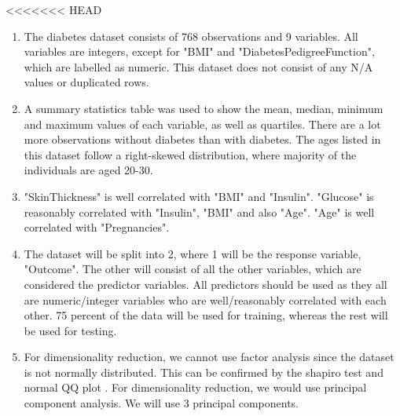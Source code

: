 \documentclass[12pt]{article}
\begin{document}
<<<<<<< HEAD
\begin{enumerate} 
	
	\item The diabetes dataset consists of 768 observations and 9 variables. All variables are integers, except for "BMI" and "DiabetesPedigreeFunction", which are labelled as numeric. This dataset does not consist of any N/A values or duplicated rows. 
	
	\item A summary statistics table was used to show the mean, median, minimum and maximum values of each variable, as well as quartiles. There are a lot more observations without diabetes than with diabetes. The ages listed in this dataset follow a right-skewed distribution, where majority of the individuals are aged 20-30. 
	
	\item "SkinThickness" is well correlated with "BMI" and "Insulin". "Glucose" is reasonably correlated with "Insulin", "BMI" and also "Age". "Age" is well correlated with "Pregnancies". 
	
	\item The dataset will be split into 2, where 1 will be the response variable, "Outcome". The other will consist of all the other variables, which are considered the predictor variables. All predictors should be used as they all are numeric/integer variables who are well/reasonably correlated with each other. 75 percent of the data will be used for training, whereas the rest will be used for testing. 
	
	\item For dimensionality reduction, we cannot use factor analysis since the dataset is not normally distributed. This can be confirmed by the shapiro test \cite{Rlang} and normal QQ plot \cite{Rlang}. For dimensionality reduction, we would use principal component analysis. We will use 3 principal components.\\  
	
	
	
		
		
		
		
		
	

\end{enumerate}
\end{document}
